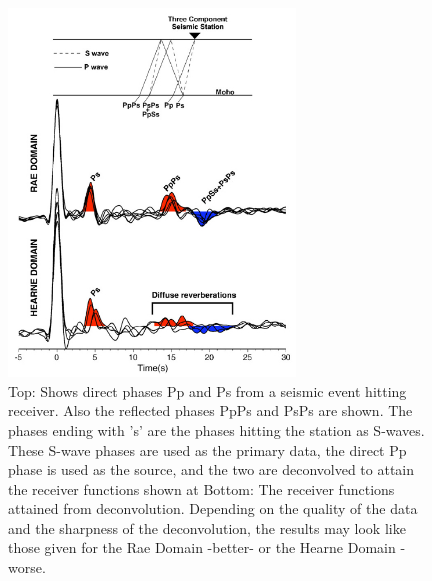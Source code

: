 \documentclass[jgrga]{agutex}
\begin{document}
\begin{article}
\begin{figure}
\noindent\includegraphics[width=18pc]{reflectRecs.jpg}
\caption{Top: Shows direct phases Pp and Ps from a seismic event hitting receiver. Also the reflected phases PpPs and PsPs are shown. The phases ending with 's' are the phases hitting the station as S-waves. These S-wave phases are used as the primary data, the direct Pp phase is used as the source, and the two are deconvolved to attain the receiver functions shown at Bottom: The receiver functions attained from deconvolution. Depending on the quality of the data and the sharpness of the deconvolution, the results may look like those given for the Rae Domain -better- or the Hearne Domain -worse.}
\end{figure}



\end{article}
\end{document}
